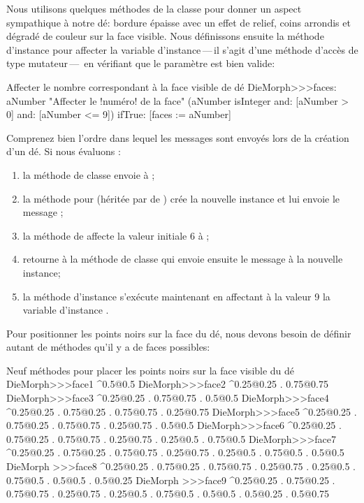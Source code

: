 \documentclass[a4paper,10pt,twoside]{book}
\begin{document}
Nous utilisons quelques méthodes de la classe 
pour donner un aspect sympathique \`a notre dé: bordure épaisse
avec un effet de relief, coins arrondis et dégradé de couleur sur
la face visible.
Nous définissons ensuite la méthode d'instance  pour
affecter la variable d'instance\,---\,il s'agit d'une méthode
d'accès de type mutateur\,---\, en vérifiant que le paramètre est
bien valide:
\begin{method}{Affecter le nombre correspondant \`a la face visible de dé}
DieMorph>>>faces: aNumber
	"Affecter le !numéro! de la face"
	(aNumber isInteger
			and: [aNumber > 0]
			and: [aNumber <= 9])
		ifTrue: [faces := aNumber]
\end{method}

Comprenez bien l'ordre dans lequel les messages sont envoyés lors de
la création d'un dé. Si nous évaluons :
\begin{enumerate}
	\item la méthode de classe  envoie
       \`a ;
	\item la méthode pour  (héritée par  de ) crée la nouvelle instance et lui envoie
       le message ;
	\item la méthode  de  affecte la
      valeur initiale 6 \`a ;
	\item {} retourne \`a la méthode de
      classe  qui envoie ensuite le
      message  \`a la nouvelle instance;
	\item la méthode d'instance  s'exécute
      maintenant en affectant \`a la valeur 9 la variable d'instance
      .
\end{enumerate}

Pour positionner les points noirs sur la face du dé, nous devons
besoin de définir autant de méthodes qu'il y a de faces possibles:

\begin{methods}{Neuf méthodes pour placer les points noirs sur la face visible du dé}
DieMorph>>>face1
	^{0.5@0.5}
DieMorph>>>face2
	^{0.25@0.25 . 0.75@0.75}
DieMorph>>>face3
	^{0.25@0.25 . 0.75@0.75 . 0.5@0.5}
DieMorph>>>face4
	^{0.25@0.25 . 0.75@0.25 . 0.75@0.75 . 0.25@0.75}
DieMorph>>>face5
	^{0.25@0.25 . 0.75@0.25 . 0.75@0.75 . 0.25@0.75 . 0.5@0.5}
DieMorph>>>face6
	^{0.25@0.25 . 0.75@0.25 . 0.75@0.75 . 0.25@0.75 . 0.25@0.5 . 0.75@0.5}
DieMorph>>>face7
	^{0.25@0.25 . 0.75@0.25 . 0.75@0.75 . 0.25@0.75 . 0.25@0.5 . 0.75@0.5 . 0.5@0.5}
DieMorph >>>face8
	^{0.25@0.25 . 0.75@0.25 . 0.75@0.75 . 0.25@0.75 . 0.25@0.5 . 0.75@0.5 . 0.5@0.5 . 0.5@0.25}
DieMorph >>>face9
	^{0.25@0.25 . 0.75@0.25 . 0.75@0.75 . 0.25@0.75 . 0.25@0.5 . 0.75@0.5 . 0.5@0.5 . 0.5@0.25 . 0.5@0.75}
\end{methods}
\end{document}
